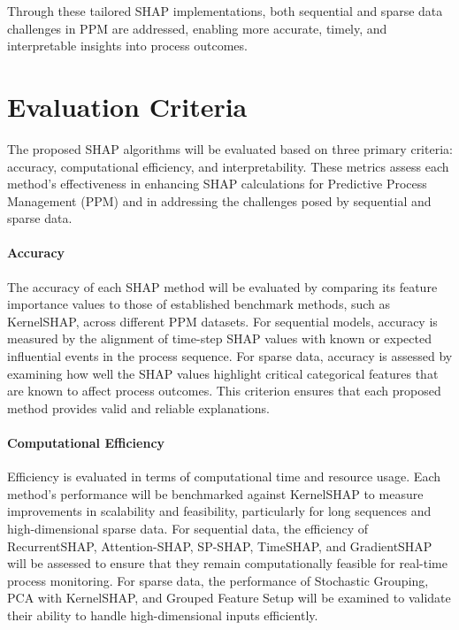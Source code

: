 Through these tailored SHAP implementations, both sequential and sparse data challenges in PPM are addressed, enabling more accurate, timely, and interpretable insights into process outcomes.

\section{Evaluation Criteria}

The proposed SHAP algorithms will be evaluated based on three primary criteria: accuracy, computational efficiency, and interpretability. These metrics assess each method’s effectiveness in enhancing SHAP calculations for Predictive Process Management (PPM) and in addressing the challenges posed by sequential and sparse data.

\paragraph{Accuracy}
The accuracy of each SHAP method will be evaluated by comparing its feature importance values to those of established benchmark methods, such as KernelSHAP, across different PPM datasets. For sequential models, accuracy is measured by the alignment of time-step SHAP values with known or expected influential events in the process sequence. For sparse data, accuracy is assessed by examining how well the SHAP values highlight critical categorical features that are known to affect process outcomes. This criterion ensures that each proposed method provides valid and reliable explanations.

\paragraph{Computational Efficiency}
Efficiency is evaluated in terms of computational time and resource usage. Each method’s performance will be benchmarked against KernelSHAP to measure improvements in scalability and feasibility, particularly for long sequences and high-dimensional sparse data. For sequential data, the efficiency of RecurrentSHAP, Attention-SHAP, SP-SHAP, TimeSHAP, and GradientSHAP will be assessed to ensure that they remain computationally feasible for real-time process monitoring. For sparse data, the performance of Stochastic Grouping, PCA with KernelSHAP, and Grouped Feature Setup will be examined to validate their ability to handle high-dimensional inputs efficiently.

